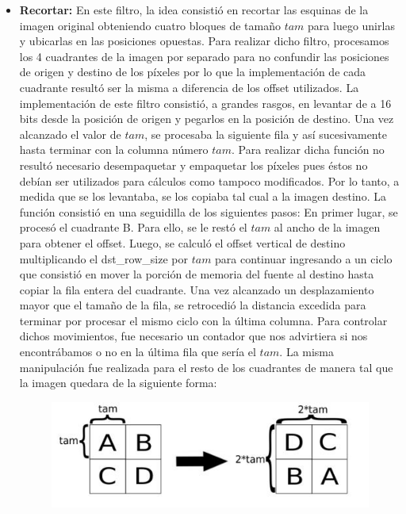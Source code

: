\documentclass[10pt, a4paper]{article}
\begin{document}
\begin{itemize}
\item {\textbf{Recortar:}}
En este filtro, la idea consistió en recortar las esquinas de la imagen original obteniendo cuatro bloques de tamaño $tam$ para luego unirlas y ubicarlas en las posiciones opuestas.\newline
Para realizar dicho filtro, procesamos los 4 cuadrantes de la imagen por separado para no confundir las posiciones de origen y destino de los píxeles por lo que la implementación de cada cuadrante resultó ser la misma a diferencia de los offset utilizados.\newline
La implementación de este filtro consistió, a grandes rasgos, en levantar de a 16 bits desde la posición de origen y pegarlos en la posición de destino. Una vez alcanzado el valor de $tam$, se procesaba la siguiente fila y así sucesivamente hasta terminar con la columna número $tam$.	\newline
Para realizar dicha función no resultó necesario desempaquetar y empaquetar los píxeles pues éstos no debían ser utilizados para cálculos como tampoco modificados. Por lo tanto, a medida que se los levantaba, se los copiaba tal cual a la imagen destino.\newline
\newline
La función consistió en una seguidilla de los siguientes pasos:\newline
En primer lugar, se procesó el cuadrante B. Para ello, se le restó el $tam$ al ancho de la imagen para obtener el offset. Luego, se calculó el offset vertical de destino multiplicando el dst\_row\_size por $tam$ para continuar ingresando a un ciclo que consistió en mover la porción de memoria del fuente al destino hasta copiar la fila entera del cuadrante. Una vez alcanzado un desplazamiento mayor que el tamaño de la fila, se retrocedió la distancia excedida para terminar por procesar el mismo ciclo con la última columna. Para controlar dichos movimientos, fue necesario un contador que nos advirtiera si nos encontrábamos o no en la última fila que sería el $tam$.\newline
La misma manipulación fue realizada para el resto de los cuadrantes de manera tal que la imagen quedara de la siguiente forma:\newline

\begin{figure}[H] %
\begin{center}
\includegraphics[width=300pt]{./recortar.jpg}
\end{center}
\end{figure}


\end{itemize}
\end{document}
